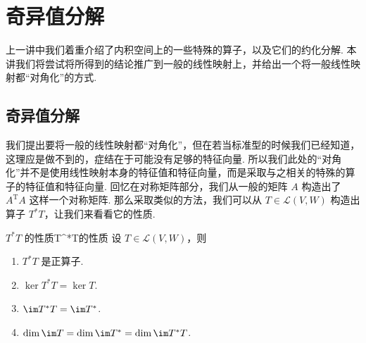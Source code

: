 \chapter{奇异值分解}

上一讲中我们着重介绍了内积空间上的一些特殊的算子，以及它们的约化分解. 本讲我们将尝试将所得到的结论推广到一般的线性映射上，并给出一个将一般线性映射都“对角化”的方式.

\section{奇异值分解}

我们提出要将一般的线性映射都“对角化”，但在若当标准型的时候我们已经知道，这理应是做不到的，症结在于可能没有足够的特征向量. 所以我们此处的“对角化”并不是使用线性映射本身的特征值和特征向量，而是采取与之相关的特殊的算子的特征值和特征向量. 回忆在对称矩阵部分，我们从一般的矩阵 $A$ 构造出了 $A^{\mathrm{T}}A$ 这样一个对称矩阵. 那么采取类似的方法，我们可以从 $T \in \mathcal{L}(V, W)$ 构造出算子 $T^*T$，让我们来看看它的性质.

\begin{theorem}{$T^*T$ 的性质}{T^*T的性质}
    设 $T \in \mathcal{L}(V, W)$，则
    \begin{enumerate}
        \item $T^*T$ 是正算子.

        \item $\ker T^*T = \ker T$.

        \item $\im T^*T = \im T^*$.

        \item $\dim \im T = \dim \im T^* = \dim \im T^*T$.
    \end{enumerate}
\end{theorem}


